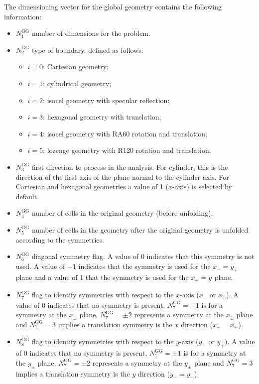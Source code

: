 The dimensioning vector for the global geometry contains the following information:
\begin{itemize}
\item $N^{\text{GG}}_{1}$ number of dimensions for the problem.
\item $N^{\text{GG}}_{2}$ type of boundary, defined as follows:
  \begin{itemize}
  \item $i=0$: Cartesian geometry;
  \item $i=1$: cylindrical geometry;
  \item $i=2$: isocel geometry with specular reflection;
  \item $i=3$: hexagonal geometry with translation;
  \item $i=4$: isocel geometry with RA60 rotation and translation;
  \item $i=5$: lozenge geometry with R120 rotation and translation.
  \end{itemize}
\item $N^{\text{GG}}_{3}$ first direction to process in the analysis. For cylinder, this is the direction of the first axis of the plane normal to the cylinder axis. For Cartesian and hexagonal geometries a value of 1 ($x$-axis) is selected by default. 
\item $N^{\text{GG}}_{4}$ number of cells in the original geometry (before unfolding).
\item $N^{\text{GG}}_{5}$ number of cells in the geometry after the original geometry is unfolded according to the symmetries.
\item $N^{\text{GG}}_{6}$ diagonal symmetry flag. A value of $0$ indicates that this symmetry is not used. A value of $-1$ indicates that the symmetry is used for the $x_{-}=y_{+}$ plane and a value of $1$ that the symmetry is used for the $x_{+}=y_{}$ plane.
\item $N^{\text{GG}}_{7}$ flag to identify symmetries with respect to the $x$-axis ($x_{-}$ or $x_{+}$). A value of $0$ indicates that no symmetry is present, $N^{\text{GG}}_{7}=\pm 1$ is for a  symmetry at the $x_{\pm}$ plane, $N^{\text{GG}}_{7}=\pm 2$ represents a  symmetry at the $x_{\pm}$ plane and $N^{\text{GG}}_{7}= 3$ implies a translation symmetry is the $x$ direction ($x_{-}=x_{+}$).
\item $N^{\text{GG}}_{8}$ flag to identify symmetries with respect to the $y$-axis ($y_{-}$ or $y_{+}$). A value of $0$ indicates that no symmetry is present, $N^{\text{GG}}_{7}=\pm 1$ is for a  symmetry at the $y_{\pm}$ plane, $N^{\text{GG}}_{7}=\pm 2$ represents a  symmetry at the $y_{\pm}$ plane and $N^{\text{GG}}_{7}= 3$ implies a translation symmetry is the $y$ direction ($y_{-}=y_{+}$).

\end{itemize}
